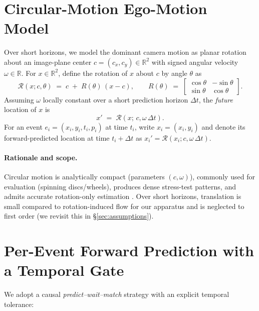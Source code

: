 \section{Circular-Motion Ego-Motion Model}
Over short horizons, we model the dominant camera motion as planar rotation about an image-plane center $c=(c_x,c_y) \in \mathbb{R}^2$ with signed angular velocity $\omega \in \mathbb{R}$. For $x \in \mathbb{R}^2$, define the rotation of $x$ about $c$ by angle $\theta$ as
\begin{equation}
\mathcal{R}(x; c, \theta) \;=\; c \;+\; R(\theta)\,(x-c),
\qquad
R(\theta) \;=\; 
\begin{bmatrix}\cos \theta & -\sin \theta\\ \sin \theta & \cos \theta\end{bmatrix}.
\label{eq:rot-operator}
\end{equation}
Assuming $\omega$ locally constant over a short prediction horizon $\Delta t$, the \emph{future} location of $x$ is
\begin{equation}
x' \;=\; \mathcal{R}\!\left(x;\, c, \omega\,\Delta t\right).
\label{eq:forward-prop}
\end{equation}
For an event $e_i=(x_i,y_i,t_i,p_i)$ at time $t_i$, write $x_i=(x_i,y_i)$ and denote its forward-predicted location at time $t_i+\Delta t$ as $x_i' = \mathcal{R}(x_i; c, \omega\,\Delta t)$.

\paragraph{Rationale and scope.}
Circular motion is analytically compact (parameters $(c,\omega)$), commonly used for evaluation (spinning discs/wheels), produces dense stress-test patterns, and admits accurate rotation-only estimation \cite{Gallego2017Angular,Stoffregen2019Segmentation,Gallego2018CMax}. Over short horizons, translation is small compared to rotation-induced flow for our apparatus and is neglected to first order (we revisit this in \S\ref{sec:assumptions}).

\section{Per-Event Forward Prediction with a Temporal Gate}\label{sec:temporal_gate}
    We adopt a causal \emph{predict–wait–match} strategy with an explicit temporal tolerance:

